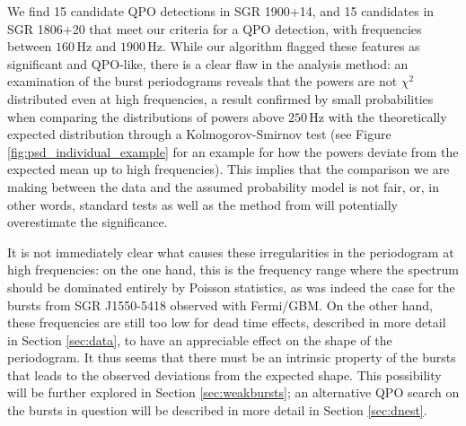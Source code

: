 \documentclass[numberedappendix]{emulateapj}
\newcommand{\hz}{\,\mathrm{Hz}}
\begin{document}
We find 15 candidate QPO detections in SGR 1900+14, and 15 candidates in SGR 1806+20 that meet our criteria for a QPO detection, with frequencies between $160\hz$ and $1900\hz$. While our algorithm
flagged these features as significant and QPO-like, there is a clear flaw in the analysis method: an examination of the burst periodograms reveals that the powers are not $\chi^2$ distributed even at high frequencies,
a result confirmed by small probabilities when comparing the distributions of powers above $250 \hz$ with the theoretically expected distribution through a Kolmogorov-Smirnov test (see Figure \ref{fig:psd_individual_example} for an example for how the powers deviate from the expected mean up to high frequencies). This implies that the comparison we are making between the data and the assumed probability model is not fair, or, in other words, standard tests as well as the method from \citet{huppenkoth2013} will potentially overestimate the significance.

It is not immediately clear what causes these irregularities in the periodogram at high frequencies: on the one hand, this is the frequency range where the spectrum should be dominated entirely by Poisson statistics,
as was indeed the case for the bursts from SGR J1550-5418 observed with Fermi/GBM. On the other hand, these frequencies are still too low for dead time effects, described in more detail in Section \ref{sec:data}, to have an
appreciable effect on the shape of the periodogram. It thus seems that there must be an intrinsic property of the bursts that leads to the observed deviations from the expected shape. This possibility will be further
explored in Section \ref{sec:weakbursts}; an alternative QPO search on the bursts in question will be described in more detail in Section \ref{sec:dnest}.


\end{document}
